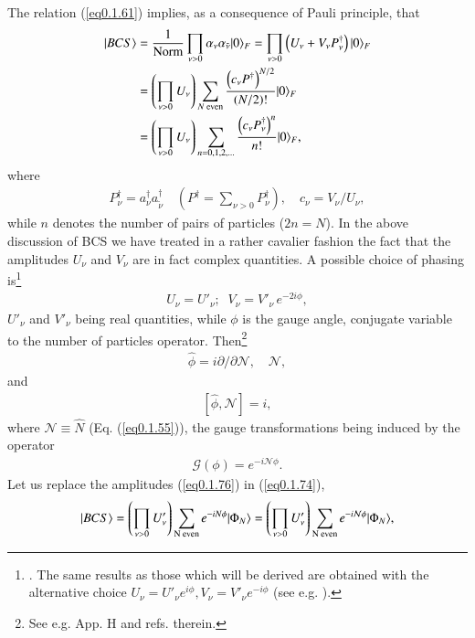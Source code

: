  The relation (\ref{eq0.1.61}) implies, as a consequence of Pauli principle, that 
\begin{align}\label{eq0.1.74}
\nonumber |{BCS} \rangle&=\frac{1}{\text{Norm}}\prod_{\nu>0}\alpha_\nu\alpha_{\tilde\nu}|{0} \rangle_F=\prod_{\nu>0}\left(U_\nu+V_\nu P^\dagger_\nu\right)|{0} \rangle_F\\
\nonumber&=\left(\prod_{\nu>0}U_{\nu}\right)\sum_{N\text{ even}} \frac{\left(c_\nu P^\dagger\right)^{N/2}}{(N/2)!}|{0} \rangle_F\\
&=\left(\prod_{\nu>0}U_\nu\right)\sum_{n=0,1,2,\dots}\frac{\left(c_\nu P^\dagger_\nu\right)^n}{n!}|{0} \rangle_F,
\end{align}
 where
\begin{align}\label{eq0.1.75}
P^\dagger_\nu=a_\nu^\dagger a^\dagger_{\tilde \nu}\quad \left(P^\dagger=\sum_{\nu>0}P^\dagger_\nu\right), \quad c_\nu=V_\nu/U_\nu,
\end{align}
while $n$ denotes the number of pairs of particles ($2n=N$).
 In the above discussion of BCS we have treated in a rather cavalier fashion the fact that the amplitudes $U_\nu$ and $V_\nu$ are in fact complex quantities. A possible choice of phasing is\footnote{\cite{Schrieffer:73}. The same results as those which will be derived are obtained with the alternative choice $U_\nu=U'_\nu e^{i\phi},V_\nu=V'_\nu e^{-i\phi}$ (see e.g. \cite{Potel:13b}).} 
\begin{align}\label{eq0.1.76}
U_\nu=U'_\nu;\;\;V_\nu=V'_\nu\, e^{-2i\phi},
\end{align}
$U'_\nu$ and $V'_\nu$ being real quantities, while $\phi$ is the gauge angle, conjugate variable to the number of particles operator. Then\footnote{See e.g. \cite{Brink:05} App. H and refs. therein.}
\begin{align}\label{eq0.1.77}
\hat\phi=i\partial/\partial \mathcal N,\quad \mathcal N,
\end{align}
and
\begin{align}\label{eq0.1.78}
\left[\hat \phi,\mathcal N\right]=i,
\end{align}
where $\mathcal N\equiv\hat N$ (Eq. (\ref{eq0.1.55})), the gauge transformations being induced by the operator 
\begin{align}\label{eq0.1.79}
\mathcal G(\phi)=e^{-i\mathcal N\phi}.
\end{align}
Let us replace the amplitudes (\ref{eq0.1.76}) in  (\ref{eq0.1.74}),
\begin{align}\label{eq0.1.80}
|{BCS} \rangle=\left(\prod_{\nu>0}U'_\nu\right)\sum_{\text{N even}}e^{-iN\phi}|{\Phi_{N}} \rangle=\left(\prod_{\nu>0}U'_\nu\right)\sum_{\text{N even}}e^{-i\mathcal N\phi}|{\Phi_{N}} \rangle,
\end{align}

